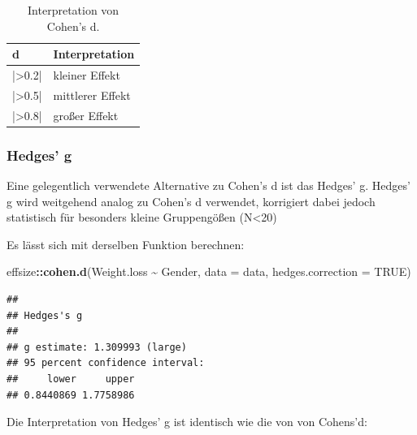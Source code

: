 \documentclass[
]{book}
\newenvironment{Shaded}{\begin{snugshade}}{\end{snugshade}}
\newcommand{\AttributeTok}[1]{\textcolor[rgb]{0.13,0.29,0.53}{#1}}
\newcommand{\ConstantTok}[1]{\textcolor[rgb]{0.56,0.35,0.01}{#1}}
\newcommand{\FunctionTok}[1]{\textcolor[rgb]{0.13,0.29,0.53}{\textbf{#1}}}
\newcommand{\NormalTok}[1]{#1}
\newcommand{\SpecialCharTok}[1]{\textcolor[rgb]{0.81,0.36,0.00}{\textbf{#1}}}
\begin{document}
\begin{table}[tbp]

\begin{center}
\begin{threeparttable}

\caption{\label{tab:unnamed-chunk-244}Interpretation von Cohen's d.}

\begin{tabular}{ll}
\toprule
d & \multicolumn{1}{c}{Interpretation}\\
\midrule
|>0.2| & kleiner Effekt\\
|>0.5| & mittlerer Effekt\\
|>0.8| & großer Effekt\\
\bottomrule
\end{tabular}

\end{threeparttable}
\end{center}

\end{table}

\subsubsection{Hedges' g}\label{hedges-g}

Eine gelegentlich verwendete Alternative zu Cohen's d ist das Hedges' g. Hedges' g wird weitgehend analog zu Cohen's d verwendet, korrigiert dabei jedoch statistisch für besonders kleine Gruppengößen (N\textless20) \citet{hedges2014statistical}

Es lässt sich mit derselben Funktion berechnen:

\begin{Shaded}
\begin{Highlighting}[]
\NormalTok{effsize}\SpecialCharTok{::}\FunctionTok{cohen.d}\NormalTok{(Weight.loss }\SpecialCharTok{\textasciitilde{}}\NormalTok{ Gender, }\AttributeTok{data =}\NormalTok{ data, }\AttributeTok{hedges.correction =} \ConstantTok{TRUE}\NormalTok{)}
\end{Highlighting}
\end{Shaded}

\begin{verbatim}
## 
## Hedges's g
## 
## g estimate: 1.309993 (large)
## 95 percent confidence interval:
##     lower     upper 
## 0.8440869 1.7758986
\end{verbatim}

Die Interpretation von Hedges' g ist identisch wie die von von Cohens'd:
\end{document}
